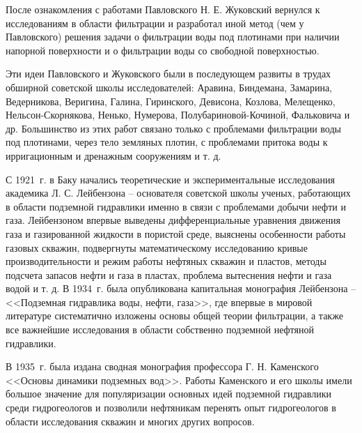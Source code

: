 После ознакомления с работами Павловского Н. Е. Жуковский вернулся к исследованиям в области фильтрации и разработал иной метод (чем у Павловского) решения задачи о фильтрации воды под плотинами при наличии напорной 
поверхности и о фильтрации воды со свободной поверхностью.

Эти идеи Павловского и Жуковского были в последующем развиты в трудах обширной советской школы исследователей: Аравина, Биндемана, Замарина, Ведерникова, Веригина, Галина, Гиринского, Девисона, Козлова, Мелещенко,
Нельсон-Скорнякова, Ненько, Нумерова, Полубариновой-Кочиной, Фальковича и др. Большинство из этих работ связано только с проблемами фильтрации воды под плотинами, через тело земляных плотин, с проблемами притока воды к
ирригационным и дренажным сооружениям и т. д.

С 1921~г. в Баку начались теоретические и экспериментальные исследования академика Л. С. Лейбензона -- основателя советской школы ученых, работающих в области подземной гидравлики именно в связи с проблемами добычи нефти
и газа. Лейбензоном впервые выведены дифференциальные уравнения движения газа и газированной жидкости в пористой среде, выяснены особенности работы газовых скважин, подвергнуты математическому исследованию кривые 
производительности и режим работы нефтяных скважин и пластов, методы подсчета запасов нефти и газа в пластах, проблема вытеснения нефти и газа водой и т. д. В 1934~г. была опубликована капитальная монография Лейбензона --
<<Подземная гидравлика воды, нефти, газа>>, где впервые в мировой литературе систематично изложены основы общей теории фильтрации, а также все важнейшие исследования в области собственно подземной нефтяной гидравлики.

В 1935~г. была издана сводная монография профессора Г. Н. Каменского <<Основы динамики подземных вод>>. Работы Каменского и его школы имели большое значение для популяризации основных идей подземной гидравлики среди 
гидрогеологов и позволили нефтяникам перенять опыт гидрогеологов в области исследования скважин и многих других вопросов.

